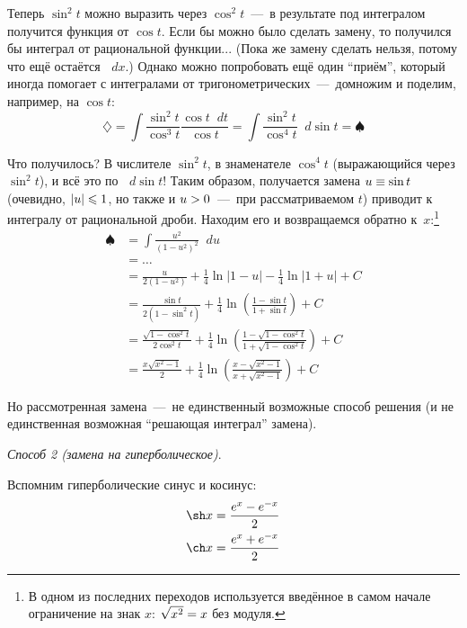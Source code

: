 \documentclass[a4paper,12pt]{article}
\newcommand{\diff}{\mathop{}\!d}
\begin{document}
\begin{example}
    Теперь $\sin^2 t$ можно выразить через $\cos^2 t$~---~в результате под интегралом получится функция от $\cos t$.
    Если бы можно было сделать замену, то получился бы интеграл от рациональной функции...
    (Пока же замену сделать нельзя, потому что ещё остаётся $\diff x$.)
    Однако можно попробовать ещё один ``приём'', который иногда помогает с интегралами от тригонометрических~---~домножим и поделим, например, на $\cos t$:
    \[
      \diamondsuit = \int \frac{\sin^2 t}{\cos^3 t} \frac{\cos t \diff t}{\cos t}
        = \int \frac{\sin^2 t}{\cos^4 t} \diff \sin t = \spadesuit
    \]

    Что получилось?
    В числителе $\sin^2 t$, в знаменателе $\cos^4 t$ (выражающийся через $\sin^2 t$), и всё это по $\diff \sin t$!
    Таким образом, получается замена $u \hm\equiv \sin t$ (очевидно, $|u| \hm\leq 1$, но также и $u \hm> 0$~---~при рассматриваемом $t$) приводит к интегралу от рациональной дроби.
    Находим его и возвращаемся обратно к~$x$:\footnote{
      В одном из последних переходов используется введённое в самом начале ограничение на знак $x$: $\sqrt{x^2} \hm= x$ без модуля.
    }
    \begin{equation*}
    \begin{split}
      \spadesuit &= \int \frac{u^2}{(1 - u^2)^2} \diff u\\
        &= \ldots\\
        &= \frac{u}{2(1 - u^2)} + \frac{1}{4} \ln\left|1 - u\right| - \frac{1}{4} \ln\left|1 + u\right| + C\\
        &=  \frac{\sin t}{2(1 - \sin^2 t)} + \frac{1}{4} \ln\left(\frac{1 - \sin t}{1 + \sin t}\right) + C\\
        &= \frac{\sqrt{1 - \cos^2 t}}{2 \cos^2 t} + \frac{1}{4} \ln\left(\frac{1 - \sqrt{1 - \cos^2 t}}{1 + \sqrt{1 - \cos^2 t}}\right) + C\\
        &= \frac{x \sqrt{x^2 - 1}}{2} + \frac{1}{4} \ln\left(\frac{x - \sqrt{x^2 - 1}}{x + \sqrt{x^2 - 1}}\right) + C
    \end{split}
    \end{equation*}

    Но рассмотренная замена~---~не единственный возможные способ решения (и не единственная возможная ``решающая интеграл'' замена).

    \medskip

    \noindent
    \emph{Способ 2 (замена на гиперболическое)}.

    Вспомним гиперболические синус и косинус:
    \begin{equation}\label{eq:sh-and-ch}
      \begin{aligned}
        &\sh x = \frac{e^x - e^{-x}}{2}\\
        &\ch x = \frac{e^x + e^{-x}}{2}
      \end{aligned}
    \end{equation}


\end{example}
\end{document}
